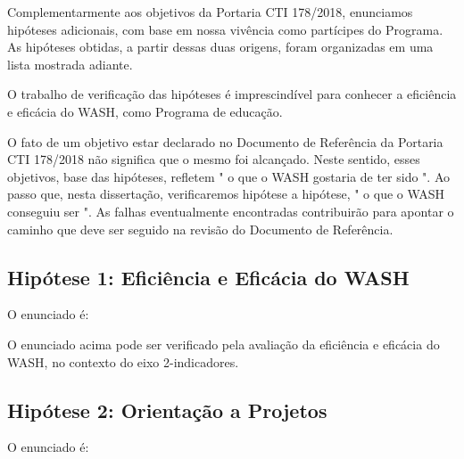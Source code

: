 Complementarmente aos objetivos da Portaria CTI 178/2018, enunciamos hipóteses adicionais, com base em nossa vivência como partícipes do Programa. As hipóteses obtidas, a partir dessas duas origens, foram organizadas em uma lista mostrada adiante.

O trabalho de verificação das hipóteses é imprescindível para conhecer a eficiência e eficácia do WASH, como Programa de educação.

O fato de um objetivo estar declarado no Documento de Referência da Portaria CTI 178/2018 não significa que o mesmo foi alcançado. Neste sentido, esses objetivos, base das hipóteses, refletem " o que o WASH gostaria de ter sido ". Ao passo que, nesta dissertação, verificaremos hipótese a hipótese, " o que o WASH conseguiu ser ". As falhas eventualmente encontradas contribuirão para apontar o caminho que deve ser seguido na revisão do Documento de Referência.

\subsection[Hipótese 1: Eficiência e Eficácia do WASH]{Hipótese 1: Eficiência e Eficácia do WASH}\label{Hipótese 1: Eficiência e Eficácia do WASH}
O enunciado é:


\noindent\begin{flushright}\mbox{\linespread{1}\selectfont\centering{}}\end{flushright}


O enunciado acima pode ser verificado pela avaliação da eficiência e eficácia do WASH, no contexto do eixo 2-indicadores.

\subsection[Hipótese 2: Orientação a Projetos]{Hipótese 2: Orientação a Projetos}\label{Hipótese 2: Orientação a Projetos}
O enunciado é:


\noindent\begin{flushright}\mbox{\linespread{1}\selectfont\centering{}}\end{flushright}


